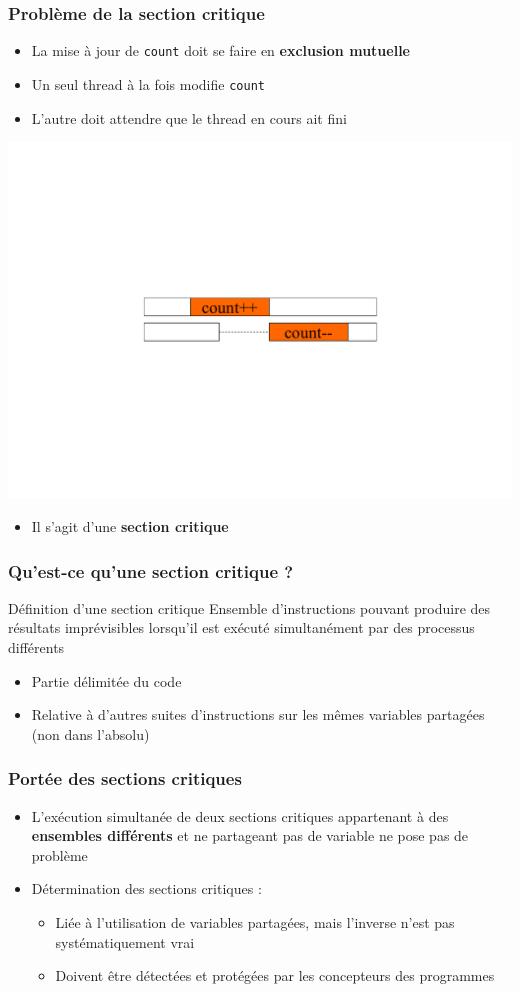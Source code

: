 \begin{frame}
\frametitle{Problème de la section critique}
\begin{itemize}
\item La mise à jour de \texttt{count} doit se faire en \textbf{exclusion mutuelle}
\item Un seul thread à la fois modifie \texttt{count} 
\item L'autre doit attendre que le thread en cours ait fini
\end{itemize}
\begin{flushright}
\includegraphics[width=.5\textwidth]{../illustration/sc_maj_count.pdf}
\end{flushright}
\begin{itemize}
\item Il s’agit d’une \textbf{section critique} 
\end{itemize}
\end{frame}

\begin{frame}
\frametitle{Qu'est-ce qu'une section critique ?}
\begin{block}{Définition d'une section critique}
Ensemble d'instructions pouvant produire des résultats imprévisibles lorsqu’il est exécuté simultanément par des processus différents
\end{block}
\begin{itemize}
\item Partie délimitée du code
\item Relative à d'autres suites d'instructions sur les mêmes variables partagées (non dans l'absolu)
\end{itemize}
\end{frame}

\begin{frame}
\frametitle{Portée des sections critiques}
\begin{itemize}
\item L'exécution simultanée de deux sections critiques appartenant à des \textbf{ensembles différents} et ne partageant pas de variable ne pose pas de problème
\item Détermination des sections critiques : 
\begin{itemize}
\item Liée à l’utilisation de variables partagées, mais l'inverse n'est pas systématiquement vrai 
\item Doivent être détectées et protégées par les concepteurs des programmes
\end{itemize}
\end{itemize}
\end{frame}

